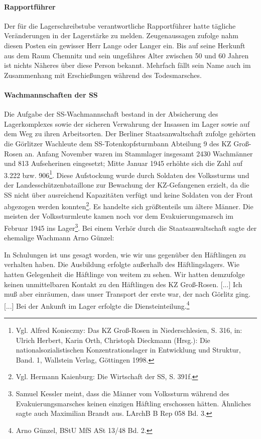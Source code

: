 \documentclass[a4paper,12pt,ngerman,
]{nisebook}
\begin{document}
\paragraph{Rapportführer}
Der für die Lagerschreibstube verantwortliche Rapportführer hatte tägliche Veränderungen in der Lagerstärke zu melden. Zeugenaussagen zufolge nahm diesen Posten ein gewisser Herr Lange oder Langer ein. Bis auf seine Herkunft aus dem Raum Chemnitz und sein ungefähres Alter zwischen 50 und 60 Jahren ist nichts Näheres über diese Person bekannt. Mehrfach fällt sein Name auch im Zusammenhang mit Erschießungen während des Todesmarsches.


\paragraph{Wachmannschaften der SS} Die Aufgabe der SS-Wachmannschaft bestand in der Absicherung des Lagerkomplexes sowie der sicheren Verwahrung der Insassen im Lager sowie auf dem Weg zu ihren Arbeitsorten.
Der Berliner Staatsanwaltschaft zufolge gehörten die Görlitzer Wachleute dem SS-Totenkopfsturmbann Abteilung 9 des KZ Groß-Rosen an. Anfang November waren im Stammlager insgesamt 2430 Wachmänner und 813 Aufseherinen eingesetzt; Mitte Januar 1945 erhöhte sich die Zahl auf 3.222 bzw. 906\footnote{Vgl. Alfred Konieczny: Das KZ Groß-Rosen in Niederschlesien, S. 316, in: Ulrich Herbert, Karin Orth, Christoph Dieckmann (Hrsg.): Die nationalsozialistischen Konzentrationslager in Entwicklung und Struktur, Band. 1, Wallstein Verlag, Göttingen 1998.}. Diese Aufstockung wurde durch Soldaten des Volkssturms und der Landesschützenbataillone zur Bewachung der KZ-Gefangenen erzielt, da die SS nicht über ausreichend Kapazitäten verfügt und keine Soldaten von der Front abgezogen werden konnten\footnote{Vgl. Hermann Kaienburg: Die Wirtschaft der SS, S. 391f.}.
Es handelte sich größtenteils um ältere Männer. Die meisten der Volkssturmleute kamen noch vor dem Evakuierungsmarsch im Februar 1945 ins Lager\footnote{Samuel Kessler meint, dass die Männer vom Volkssturm während des Evakuierungsmarsches keinen einzigen Häftling erschossen hätten. Ähnliches sagte auch Maximilian Brandt aus. LArchB B Rep 058 Bd. 3.}. Bei einem Verhör durch die Staatsanwaltschaft sagte der ehemalige Wachmann Arno Günzel:

\begin{leftbar}
In Schulungen ist uns gesagt worden, wie wir uns gegenüber den Häftlingen zu verhalten haben. Die Ausbildung erfolgte außerhalb des Häftlingslagers. Wie hatten Gelegenheit die Häftlinge von weitem zu sehen. Wir hatten demzufolge keinen unmittelbaren Kontakt zu den Häftlingen des KZ Groß-Rosen. [...] Ich muß aber einräumen, dass unser Transport der erste war, der nach Görlitz ging. [...] Bei der Ankunft im Lager erfolgte die Diensteinteilung.\footnote{Arno Günzel, BStU MfS ASt 13/48 Bd. 2.}
\end{leftbar}
\end{document}

